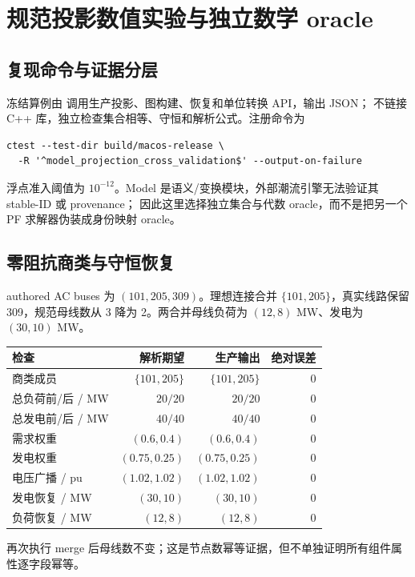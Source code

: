 \section{规范投影数值实验与独立数学 oracle}

\subsection{复现命令与证据分层}

冻结算例由
调用生产投影、图构建、恢复和单位转换 API，输出 JSON；
不链接 C++ 库，独立检查集合相等、守恒和解析公式。注册命令为
\begin{verbatim}
ctest --test-dir build/macos-release \
  -R '^model_projection_cross_validation$' --output-on-failure
\end{verbatim}
浮点准入阈值为 $10^{-12}$。Model 是语义/变换模块，外部潮流引擎无法验证其 stable-ID 或 provenance；
因此这里选择独立集合与代数 oracle，而不是把另一个 PF 求解器伪装成身份映射 oracle。

\subsection{零阻抗商类与守恒恢复}

authored AC buses 为 $(101,205,309)$。理想连接合并 $\{101,205\}$，真实线路保留 309，规范母线数从 3
降为 2。两合并母线负荷为 $(12,8)$ MW、发电为 $(30,10)$ MW。

\begin{center}\small
\begin{tabular}{@{}lrrr@{}}\toprule
检查 & 解析期望 & 生产输出 & 绝对误差\\\midrule
商类成员 & $\{101,205\}$ & $\{101,205\}$ & 0\\
总负荷前/后 / MW & $20/20$ & $20/20$ & 0\\
总发电前/后 / MW & $40/40$ & $40/40$ & 0\\
需求权重 & $(0.6,0.4)$ & $(0.6,0.4)$ & 0\\
发电权重 & $(0.75,0.25)$ & $(0.75,0.25)$ & 0\\
电压广播 / pu & $(1.02,1.02)$ & $(1.02,1.02)$ & 0\\
发电恢复 / MW & $(30,10)$ & $(30,10)$ & 0\\
负荷恢复 / MW & $(12,8)$ & $(12,8)$ & 0\\\bottomrule
\end{tabular}
\end{center}
再次执行 merge 后母线数不变；这是节点数幂等证据，但不单独证明所有组件属性逐字段幂等。

